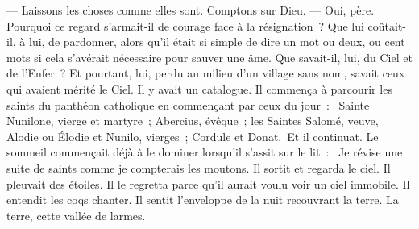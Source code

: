\begin{pages}
\begin{Rightside}
			\guillemotright --- Laissons les choses comme elles sont. Comptons sur Dieu.
		\pend
		\pstart
			\guillemotright --- Oui, père. \fg{}
		\pend
		\pstart
			Pourquoi ce regard s’armait-il de courage face à la résignation ? Que lui coûtait-il, à lui, de pardonner, alors qu’il était si simple de dire un mot ou deux, ou cent mots si cela s’avérait nécessaire pour sauver une âme. Que savait-il, lui, du Ciel et de l’Enfer ? Et pourtant, lui, perdu au milieu d’un village sans nom, savait ceux qui avaient mérité le Ciel. Il y avait un catalogue. Il commença à parcourir les saints du panthéon catholique en commençant par ceux du jour : \og{} Sainte Nunilone, vierge et martyre ; Abercius, évêque ; les Saintes Salomé, veuve, Alodie ou Élodie et Nunilo, vierges ; Cordule et Donat. \fg{}Et il continuat. Le sommeil commençait déjà à le dominer lorsqu’il s’assit sur le lit : \og{} Je révise une suite de saints comme je compterais les moutons.\fg{}
		\pend
		\pstart
			Il sortit et regarda le ciel. Il pleuvait des étoiles. Il le regretta parce qu’il aurait voulu voir un ciel immobile. Il entendit les coqs chanter. Il sentit l’enveloppe de la nuit recouvrant la terre. La terre, \og{}cette vallée de larmes\fg{}.
		\pend
		\endnumbering
	\end{Rightside}

\end{pages}
\Pages
